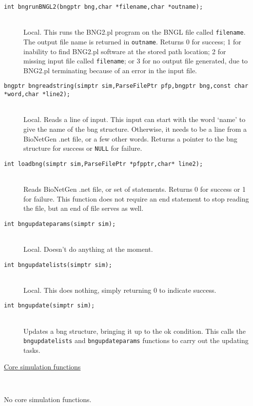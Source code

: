 \documentclass {scrbook}
\newcommand {\ttt} {\texttt}
\begin{document}
\begin{description}
\item[\ttt{int bngrunBNGL2(bngptr bng,char *filename,char *outname);}]
\hfill \\
Local. This runs the BNG2.pl program on the BNGL file called \ttt{filename}. The output file name is returned in \ttt{outname}. Returns 0 for success; 1 for inability to find BNG2.pl software at the stored path location; 2 for missing input file called \ttt{filename}; or 3 for no output file generated, due to BNG2.pl terminating because of an error in the input file.

\item[\ttt{bngptr bngreadstring(simptr sim,ParseFilePtr pfp,bngptr bng,const char *word,char *line2);}]
\hfill \\
Local. Reads a line of input. This input can start with the word `name' to give the name of the bng structure. Otherwise, it needs to be a line from a BioNetGen .net file, or a few other words. Returns a pointer to the bng structure for success or \ttt{NULL} for failure.

\item[\ttt{int loadbng(simptr sim,ParseFilePtr *pfpptr,char* line2);}]
\hfill \\
Reads BioNetGen .net file, or set of statements. Returns 0 for success or 1 for failure. This function does not require an end statement to stop reading the file, but an end of file serves as well.

\item[\ttt{int bngupdateparams(simptr sim);}]
\hfill \\
Local. Doesn't do anything at the moment.

\item[\ttt{int bngupdatelists(simptr sim);}]
\hfill \\
Local. This does nothing, simply returning 0 to indicate success.

\item[\ttt{int bngupdate(simptr sim);}]
\hfill \\
Updates a bng structure, bringing it up to the ok condition. This calls the \ttt{bngupdatelists} and \ttt{bngupdateparams} functions to carry out the updating tasks.

\item[\underline{Core simulation functions}]
\hfill \\

\item[No core simulation functions.]

\end{description}
\end{document}
